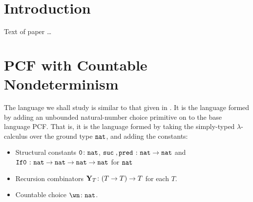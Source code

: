 \documentclass[sigplan,10pt,review]{acmart}\settopmatter{printfolios=true,printccs=false,printacmref=false}
\begin{document}




\maketitle


\section{Introduction}

Text of paper \ldots

\section{PCF with Countable Nondeterminism}

The language we shall study is similar to that given in \cite{LairdOrdinalGames}.  
It is the language formed by adding an unbounded natural-number choice primitive on to the base language PCF.  
That is, it is the language formed by taking the simply-typed $\lambda$-calculus over the ground type ${\mathtt{nat}}$, and adding the constants:
\begin{itemize}
  \item Structural constants ${\mathtt{0}}\colon{\mathtt{nat}}$, ${\mathtt{suc\;}},{\mathtt{pred\;}}\colon{\mathtt{nat}}\to{\mathtt{nat}}$ and ${\mathtt{If0}\;} \colon {\mathtt{nat}} \to {\mathtt{nat}} \to {\mathtt{nat}} \to {\mathtt{nat}}$ for ${\mathtt{nat}}$
  \item Recursion combinators $\mathbf{Y}_T \colon (T \to T) \to T$ for each $T$.
  \item Countable choice $\wn\from\nat$.
\end{itemize}
\end{document}
